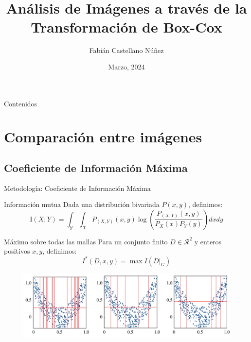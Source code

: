 \documentclass{beamer}
\title[Defensa de Memoria]{\bf An\'alisis de Im\'agenes a trav\'es de la Transformaci\'on de Box-Cox}
\author{Fabián Castellano Núñez}
\institute[Universidad Técnica Federico Santa María]
  {
  Profesor Guia: Ronny Vallejos A.
  }
\date{Marzo,  2024}
\begin{document}
\begin{frame}
  \titlepage
\end{frame}

\begin{frame}{Contenidos}
  \tableofcontents
\end{frame}





\section{Comparación entre imágenes}
\subsection{Coeficiente de Información Máxima}

\begin{frame}{Metodología: Coeficiente de Información Máxima}
     
    
    \begin{block}{Información mutua}
    Dada una distribución bivariada $P(x,y)$, definimos:
        \begin{equation}\label{información mutua}
            \mathrm{I}(X ; Y)=\int_{\mathcal{Y}} \int_{\mathcal{X}} P_{(X, Y)}(x, y) \log \left(\frac{P_{(X, Y)}(x, y)}{P_{X}(x) P_{Y}(y)}\right)dxdy
        \end{equation}
    \end{block}
     


    \begin{block}{Máximo sobre todas las mallas}
        Para un conjunto finito $D\in\mathcal{R}  ^2$ y enteros positivos $x,y$, definimos:
		$$
		I^*(D,x,y)=\max I(D|_G)
		$$
    \end{block}
    \begin{figure}
        \centering
        \includegraphics[scale=0.6] {rsos201424f03.png}
        \label{fig:my_label}
    \end{figure}
\end{frame}
\end{document}
